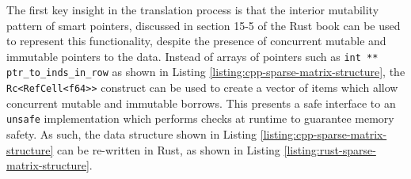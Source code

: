 

The first key insight in the translation process is that the interior mutability pattern of smart pointers, discussed in section 15-5 of the Rust book \cite{RustProgrammingLanguage} can be used to represent this functionality, despite the presence of concurrent mutable and immutable pointers to the data. Instead of arrays of pointers such as \texttt{int ** ptr_to_inds_in_row} as shown in Listing \ref{listing:cpp-sparse-matrix-structure}, the \texttt{Rc<RefCell<f64>>} construct can be used to create a vector of items which allow concurrent mutable and immutable borrows. This presents a safe interface to an \texttt{unsafe} implementation which performs checks at runtime to guarantee memory safety. As such, the data structure shown in Listing \ref{listing:cpp-sparse-matrix-structure} can be re-written in Rust, as shown in Listing \ref{listing:rust-sparse-matrix-structure}.

